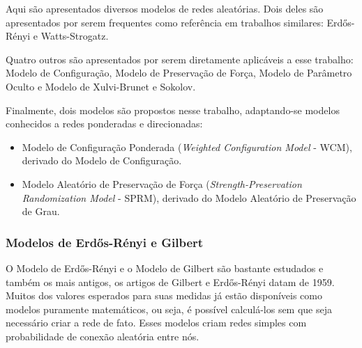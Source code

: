\documentclass[12pt,a4paper,final]{article}
\begin{document}
Aqui são apresentados diversos modelos de redes aleatórias. Dois deles são apresentados por serem frequentes como referência em trabalhos similares: Erdős-Rényi e Watts-Strogatz.

Quatro outros são apresentados por serem diretamente aplicáveis a esse trabalho: Modelo de Configuração, Modelo de Preservação de Força, Modelo de Parâmetro Oculto e Modelo de Xulvi-Brunet e Sokolov.

Finalmente, dois modelos são propostos nesse trabalho, adaptando-se modelos conhecidos a redes ponderadas e direcionadas:
\begin{itemize}
\item Modelo de Configuração Ponderada (\textit{Weighted Configuration Model} - WCM), derivado do Modelo de Configuração.
\item Modelo Aleatório de Preservação de Força (\textit{Strength-Preservation Randomization Model} - SPRM), derivado do Modelo Aleatório de Preservação de Grau.
\end{itemize}


\subsubsection{Modelos de Erdős-Rényi e Gilbert}

O Modelo de Erdős-Rényi e o Modelo de Gilbert são bastante estudados e também os mais antigos, os artigos de Gilbert e Erdős-Rényi datam de 1959. Muitos dos valores esperados para suas medidas já estão disponíveis como modelos puramente matemáticos, ou seja, é possível calculá-los sem que seja necessário criar a rede de fato. Esses modelos criam redes simples com probabilidade de conexão aleatória entre nós.
\end{document}
